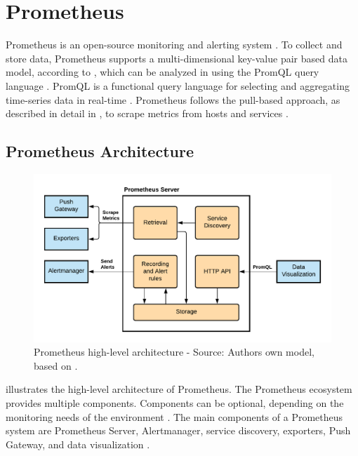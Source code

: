 \section{Prometheus}
\label{sec:04_prom}
Prometheus is an open-source monitoring and alerting system \cite{Prom2020Docs}.
To collect and store data, Prometheus supports a multi-dimensional key-value pair based data model, according to , which can be analyzed in using the PromQL query language \cite{Pandey2020Monitoring}.
PromQL is a functional query language for selecting and aggregating time-series data in real-time \cite{Prom2020Docs}.
Prometheus follows the pull-based approach, as described in detail in , to scrape metrics from hosts and services \cite{Bastos2019Prom}.


\subsection{Prometheus Architecture}
\label{sec:04_prom_arch}
\begin{figure}[h]
\centering
\includegraphics[scale=0.8]{images/04_technical_background/prometheus/prometheus_architecture}
\caption{Prometheus high-level architecture - Source: Authors own model, based on \cite{Prom2020Docs, Brazil2018Prom}.}
\label{fig:prom_architecture}
\end{figure}

 illustrates the high-level architecture of Prometheus.
The Prometheus ecosystem provides multiple components. Components can be optional, depending on the monitoring needs of the environment \cite{Bastos2019Prom}. The main components of a Prometheus system are Prometheus Server, Alertmanager, service discovery, exporters, Push Gateway, and data visualization \cite{Prom2020Docs}.

